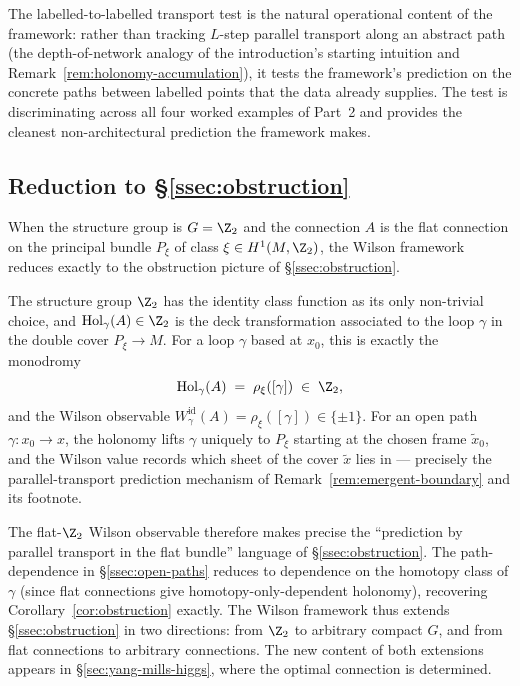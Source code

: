 The labelled-to-labelled transport test is the natural operational
content of the framework: rather than tracking $L$-step parallel
transport along an abstract path (the depth-of-network analogy of
the introduction's starting intuition and
Remark~\ref{rem:holonomy-accumulation}), it
tests the framework's prediction on the concrete paths between
labelled points that the data already supplies. The test is
discriminating across all four worked examples of Part~2 and
provides the cleanest non-architectural prediction the framework
makes.

\subsection{Reduction to \S\ref{ssec:obstruction}}\label{ssec:wilson-reduction}

When the structure group is $G=\Z_2$ and the connection $A$ is the
flat connection on the principal bundle $P_\xi$ of class
$\xi\in H^1(M,\Z_2)$, the Wilson framework reduces exactly to the
obstruction picture of \S\ref{ssec:obstruction}.

The structure group $\Z_2$ has the identity class function as its
only non-trivial choice, and
$\mathrm{Hol}_\gamma(A)\in\Z_2$ is the deck transformation
associated to the loop $\gamma$ in the double cover $P_\xi\to M$.
For a loop $\gamma$ based at $x_0$, this is exactly the monodromy
\[
   \mathrm{Hol}_\gamma(A) \;=\; \rho_\xi([\gamma]) \;\in\; \Z_2,
\]
and the Wilson observable $W_\gamma^{\mathrm{id}}(A)=\rho_\xi([\gamma])
\in\{\pm 1\}$. For an open path $\gamma\colon x_0\to x$, the
holonomy lifts $\gamma$ uniquely to $P_\xi$ starting at the chosen
frame $\tilde x_0$, and the Wilson value records which sheet of the
cover $\tilde x$ lies in --- precisely the parallel-transport
prediction mechanism of Remark~\ref{rem:emergent-boundary} and its
footnote.

The flat-$\Z_2$ Wilson observable therefore makes precise the
``prediction by parallel transport in the flat bundle'' language of
\S\ref{ssec:obstruction}. The path-dependence in
\S\ref{ssec:open-paths} reduces to dependence on the homotopy class
of $\gamma$ (since flat connections give homotopy-only-dependent
holonomy), recovering Corollary~\ref{cor:obstruction} exactly. The
Wilson framework thus extends \S\ref{ssec:obstruction} in two
directions: from $\Z_2$ to arbitrary compact $G$, and from flat
connections to arbitrary connections. The new content of both
extensions appears in \S\ref{sec:yang-mills-higgs}, where the
optimal connection is determined.

